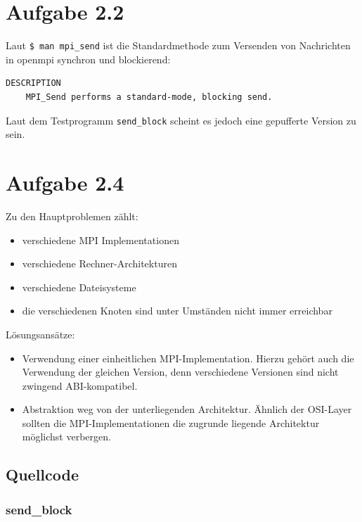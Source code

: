\documentclass[a4paper,
12pt,
BCOR12mm,
]{scrartcl}
\begin{document}
\section*{Aufgabe 2.2}
Laut \verb|$ man mpi_send| ist die Standardmethode zum Versenden von Nachrichten in
openmpi synchron und blockierend:
\begin{verbatim}
DESCRIPTION
	MPI_Send performs a standard-mode, blocking send.
\end{verbatim}

Laut dem Testprogramm \verb|send_block| scheint es jedoch eine gepufferte Version zu sein.



\section*{Aufgabe 2.4}
Zu den Hauptproblemen zählt:
\begin{itemize}
	\item verschiedene MPI Implementationen
	\item verschiedene Rechner-Architekturen
	\item verschiedene Dateisysteme
	\item die verschiedenen Knoten sind unter Umständen nicht immer erreichbar
\end{itemize}

Lösungsansätze:
\begin{itemize}
	\item Verwendung einer einheitlichen MPI-Implementation. Hierzu gehört auch die
		Verwendung der gleichen Version, denn verschiedene Versionen sind nicht zwingend
		ABI-kompatibel.
	\item Abstraktion weg von der unterliegenden Architektur. Ähnlich der OSI-Layer sollten
	die MPI-Implementationen die zugrunde liegende Architektur möglichst verbergen.
\end{itemize}

\nocite{*}

%
\newpage
\subsection*{Quellcode}
\subsubsection*{send\_block}

\end{document}
